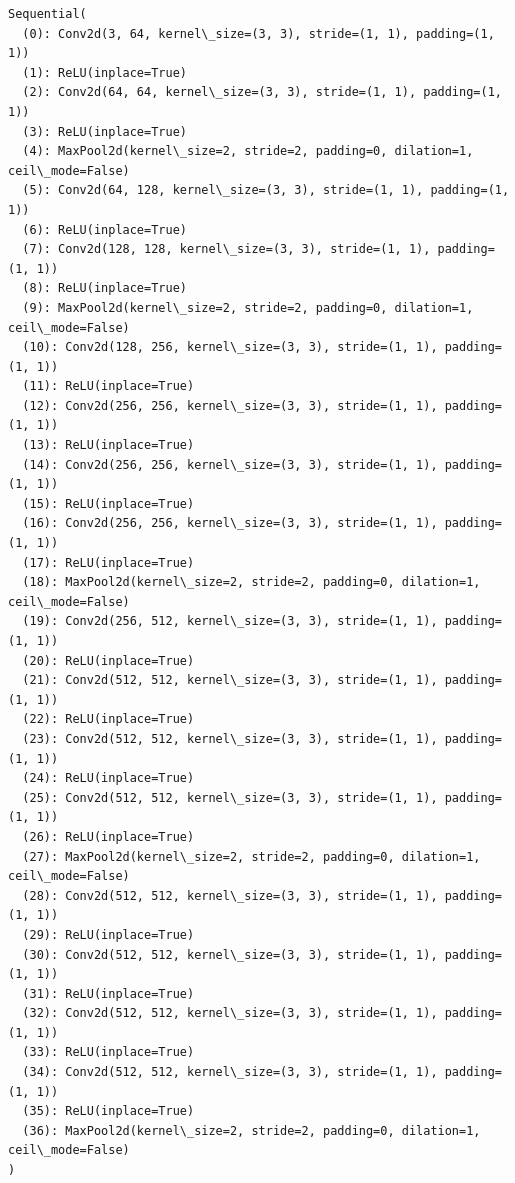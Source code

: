 \documentclass[11pt]{article}
\begin{document}
    \begin{Verbatim}[commandchars=\\\{\}]
Sequential(
  (0): Conv2d(3, 64, kernel\_size=(3, 3), stride=(1, 1), padding=(1, 1))
  (1): ReLU(inplace=True)
  (2): Conv2d(64, 64, kernel\_size=(3, 3), stride=(1, 1), padding=(1, 1))
  (3): ReLU(inplace=True)
  (4): MaxPool2d(kernel\_size=2, stride=2, padding=0, dilation=1,
ceil\_mode=False)
  (5): Conv2d(64, 128, kernel\_size=(3, 3), stride=(1, 1), padding=(1, 1))
  (6): ReLU(inplace=True)
  (7): Conv2d(128, 128, kernel\_size=(3, 3), stride=(1, 1), padding=(1, 1))
  (8): ReLU(inplace=True)
  (9): MaxPool2d(kernel\_size=2, stride=2, padding=0, dilation=1,
ceil\_mode=False)
  (10): Conv2d(128, 256, kernel\_size=(3, 3), stride=(1, 1), padding=(1, 1))
  (11): ReLU(inplace=True)
  (12): Conv2d(256, 256, kernel\_size=(3, 3), stride=(1, 1), padding=(1, 1))
  (13): ReLU(inplace=True)
  (14): Conv2d(256, 256, kernel\_size=(3, 3), stride=(1, 1), padding=(1, 1))
  (15): ReLU(inplace=True)
  (16): Conv2d(256, 256, kernel\_size=(3, 3), stride=(1, 1), padding=(1, 1))
  (17): ReLU(inplace=True)
  (18): MaxPool2d(kernel\_size=2, stride=2, padding=0, dilation=1,
ceil\_mode=False)
  (19): Conv2d(256, 512, kernel\_size=(3, 3), stride=(1, 1), padding=(1, 1))
  (20): ReLU(inplace=True)
  (21): Conv2d(512, 512, kernel\_size=(3, 3), stride=(1, 1), padding=(1, 1))
  (22): ReLU(inplace=True)
  (23): Conv2d(512, 512, kernel\_size=(3, 3), stride=(1, 1), padding=(1, 1))
  (24): ReLU(inplace=True)
  (25): Conv2d(512, 512, kernel\_size=(3, 3), stride=(1, 1), padding=(1, 1))
  (26): ReLU(inplace=True)
  (27): MaxPool2d(kernel\_size=2, stride=2, padding=0, dilation=1,
ceil\_mode=False)
  (28): Conv2d(512, 512, kernel\_size=(3, 3), stride=(1, 1), padding=(1, 1))
  (29): ReLU(inplace=True)
  (30): Conv2d(512, 512, kernel\_size=(3, 3), stride=(1, 1), padding=(1, 1))
  (31): ReLU(inplace=True)
  (32): Conv2d(512, 512, kernel\_size=(3, 3), stride=(1, 1), padding=(1, 1))
  (33): ReLU(inplace=True)
  (34): Conv2d(512, 512, kernel\_size=(3, 3), stride=(1, 1), padding=(1, 1))
  (35): ReLU(inplace=True)
  (36): MaxPool2d(kernel\_size=2, stride=2, padding=0, dilation=1,
ceil\_mode=False)
)
    \end{Verbatim}

\pagebreak
\end{document}
